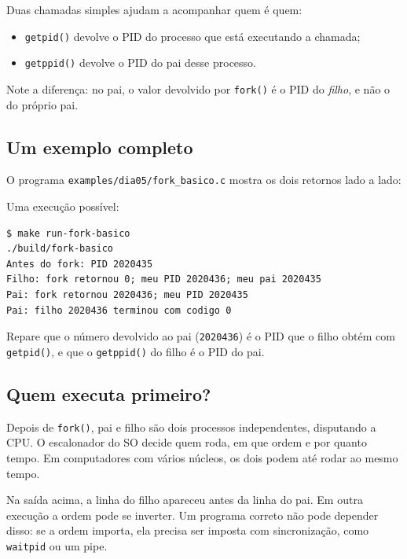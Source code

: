 \documentclass[11pt,a4paper]{article}
\newcommand{\raiz}{../../../..}
\newcommand{\cmd}[1]{\texttt{#1}}
\begin{document}
Duas chamadas simples ajudam a acompanhar quem é quem:

\begin{itemize}
    \item \cmd{getpid()} devolve o PID do processo que está executando a chamada;
    \item \cmd{getppid()} devolve o PID do pai desse processo.
\end{itemize}

Note a diferença: no pai, o valor devolvido por \cmd{fork()} é o PID do \emph{filho}, e não o do próprio pai.

\subsection{Um exemplo completo}

O programa \cmd{examples/dia05/fork\_basico.c} mostra os dois retornos lado a lado:



Uma execução possível:

\begin{lstlisting}[style=terminal]
$ make run-fork-basico
./build/fork-basico
Antes do fork: PID 2020435
Filho: fork retornou 0; meu PID 2020436; meu pai 2020435
Pai: fork retornou 2020436; meu PID 2020435
Pai: filho 2020436 terminou com codigo 0
\end{lstlisting}

Repare que o número devolvido ao pai (\cmd{2020436}) é o PID que o filho obtém com \cmd{getpid()}, e que o \cmd{getppid()} do filho é o PID do pai.

\subsection{Quem executa primeiro?}

Depois de \cmd{fork()}, pai e filho são dois processos independentes, disputando a CPU. O escalonador do SO decide quem roda, em que ordem e por quanto tempo. Em computadores com vários núcleos, os dois podem até rodar ao mesmo tempo.

\begin{alerta}
Na saída acima, a linha do filho apareceu antes da linha do pai. Em outra execução a ordem pode se inverter. Um programa correto não pode depender disso: se a ordem importa, ela precisa ser imposta com sincronização, como \cmd{waitpid} ou um pipe.
\end{alerta}
\end{document}
